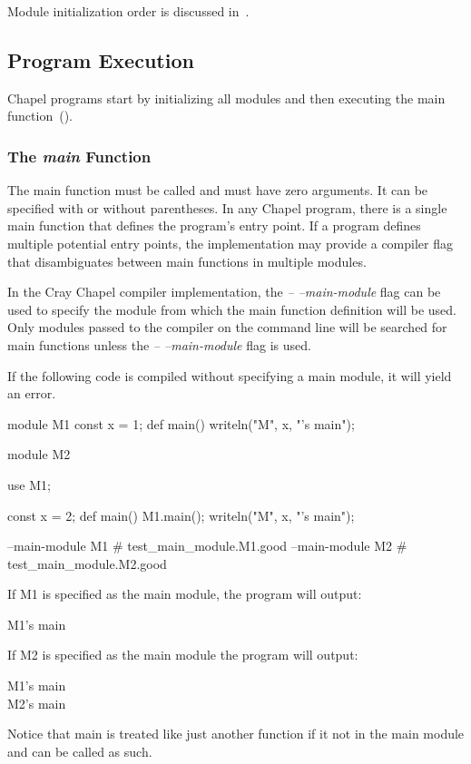 Module initialization order is discussed
in~.



\subsection{Program Execution}
\label{Program_Execution}

Chapel programs start by initializing all modules and then executing
the main function~().

\subsubsection{The {\em main} Function}
\label{The_main_Function}

The main function must be called  and must have zero
arguments.  It can be specified with or without parentheses.  In any
Chapel program, there is a single main function that defines the
program's entry point.  If a program defines multiple potential entry
points, the implementation may provide a compiler flag that
disambiguates between main functions in multiple modules.

\begin{craychapel}
In the Cray Chapel compiler implementation, the \emph{--
--main-module} flag can be used to specify the module from which the
main function definition will be used.  Only modules passed to the
compiler on the command line will be searched for main functions
unless the \emph{-- --main-module} flag is used.
\end{craychapel}

\begin{example}
If the following code is compiled without specifying a main module, it
will yield an error.
\begin{chapelpre}
\end{chapelpre}
\begin{chapel}
module M1 {
  const x = 1;
  def main() {
    writeln("M", x, "'s main");
  }
}
 
module M2 {
  use M1;

  const x = 2;
  def main() {
    M1.main();
    writeln("M", x, "'s main");
  }
}
\end{chapel}
\begin{chapelcompopts}
--main-module M1 \# test\_main\_module.M1.good
--main-module M2 \# test\_main\_module.M2.good
\end{chapelcompopts}
If M1 is specified as the main module, the program will output:
\begin{chapelprintoutput}
M1's main
\end{chapelprintoutput}
If M2 is specified as the main module the program will output:
\begin{chapelprintoutput}
M1's main\\
M2's main
\end{chapelprintoutput}
Notice that main is treated like just another function if it not in
the main module and can be called as such.
\end{example}

